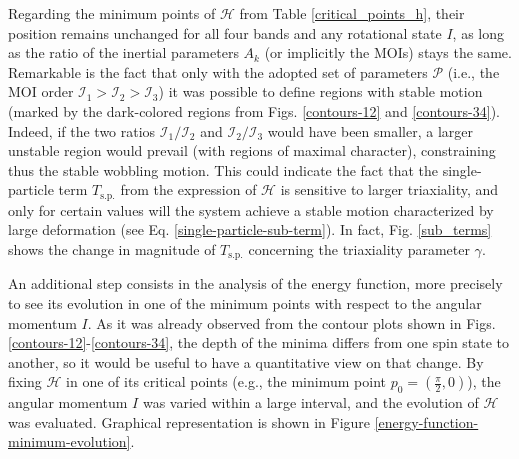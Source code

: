 \documentclass[myclassdoc,debug]{rjparticle}
\begin{document}
Regarding the minimum points of $\mathcal{H}$ from Table \ref{critical_points_h}, their position remains unchanged for all four bands and any rotational state $I$, as long as the ratio of the inertial parameters $A_k$ (or implicitly the MOIs) stays the same. Remarkable is the fact that only with the adopted set of parameters $\mathcal{P}$ (i.e., the MOI order $\mathcal{I}_1>\mathcal{I}_2>\mathcal{I}_3$) it was possible to define regions with stable motion (marked by the dark-colored regions from Figs. \ref{contours-12} and \ref{contours-34}). Indeed, if the two ratios $\mathcal{I}_1/\mathcal{I}_2$ and $\mathcal{I}_2/\mathcal{I}_3$ would have been smaller, a larger unstable region would prevail (with regions of maximal character), constraining thus the stable wobbling motion. This could indicate the fact that the single-particle term $T_\text{s.p.}$ from the expression of $\mathcal{H}$ is sensitive to larger triaxiality, and only for certain values will the system achieve a stable motion characterized by large deformation (see Eq. \ref{single-particle-sub-term}). In fact, Fig. \ref{sub_terms} shows the change in magnitude of $T_\text{s.p.}$ concerning the triaxiality parameter $\gamma$.

An additional step consists in the analysis of the energy function, more precisely to see its evolution in one of the minimum points with respect to the angular momentum $I$. As it was already observed from the contour plots shown in Figs. \ref{contours-12}-\ref{contours-34}, the depth of the minima differs from one spin state to another, so it would be useful to have a quantitative view on that change. By fixing $\mathcal{H}$ in one of its critical points (e.g., the minimum point $p_0=(\frac{\pi}{2},0)$), the angular momentum $I$ was varied within a large interval, and the evolution of $\mathcal{H}$ was evaluated. Graphical representation is shown in Figure \ref{energy-function-minimum-evolution}.
\end{document}
